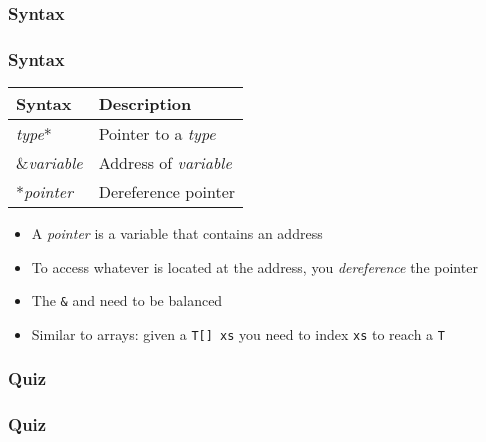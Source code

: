 \documentclass{../ucll-slides}
\newcommand{\drawboxaround}[1]{
  \draw[box] ($ (#1.south west) + (-.15,-.15) $) rectangle ($ (#1.north east) + (.15,.15) $);
}
\begin{document}
\begin{frame}
  \frametitle{Syntax}
  \vskip5mm

\end{frame}

\begin{frame}
  \frametitle{Syntax}
  \begin{center}
    \begin{tabular}{ll}
      \textbf{Syntax}  & \textbf{Description} \\
      \toprule
      {\it type}*      & Pointer to a {\it type} \\
      \&{\it variable} & Address of {\it variable} \\
      *{\it pointer}   & Dereference pointer \\
    \end{tabular}
  \end{center}
  \begin{itemize}
    \item A \emph{pointer} is a variable that contains an address
    \item To access whatever is located at the address, you \emph{dereference} the pointer
    \item The {\tt \&} and {\tt *} need to be balanced
    \item Similar to arrays: given a {\tt T[] xs} you need to index {\tt xs} to reach a {\tt T}
  \end{itemize}
\end{frame}

\begin{frame}
  \frametitle{Quiz}
  \begin{center}
  \end{center}
\end{frame}

\begin{frame}
  \frametitle{Quiz}
  \begin{center}
  \end{center}
\end{frame}
\end{document}
